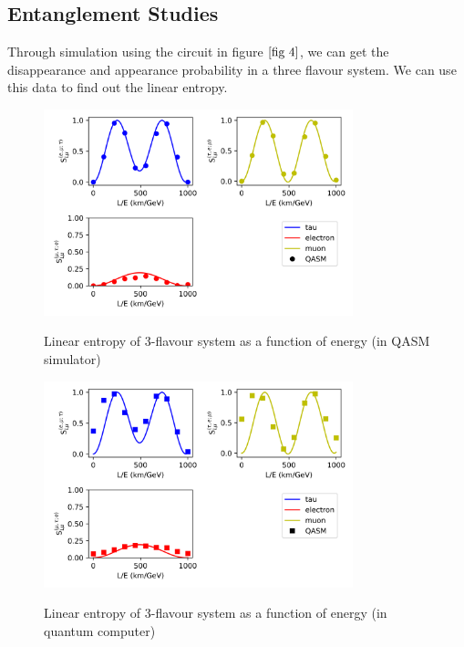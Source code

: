 \documentclass[12pt,a4paper]{report}
\begin{document}
\subsection{Entanglement Studies}
Through simulation using the circuit in figure $\ref{fig 4}$, we can get the disappearance and appearance probability in a three flavour system. We can use this data to find out the linear entropy.
\begin{figure}[H]
	\graphicspath{ {./Images/} }
	\centering	
	{\includegraphics[width=0.8\textwidth]{fig_9a.png}}
	\caption{Linear entropy of 3-flavour system as a function of energy (in QASM simulator)}
	\label{fig 9a}
\end{figure}
\begin{figure}[H]
	\graphicspath{ {./Images/} }
	\centering	
	{\includegraphics[width=0.8\textwidth]{fig_9b.png}}
	\caption{Linear entropy of 3-flavour system as a function of energy (in quantum computer)}
	\label{fig 9b}
\end{figure}
\end{document}
